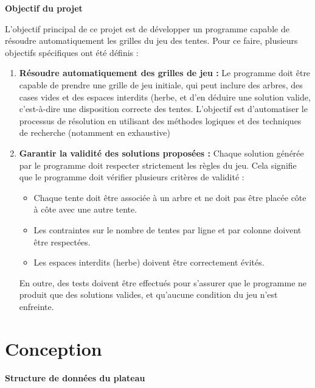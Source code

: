 \documentclass{article}
\begin{document}
\textbf{Objectif du projet}

L'objectif principal de ce projet est de développer un programme capable de résoudre automatiquement les grilles du jeu des tentes. Pour ce faire, plusieurs objectifs spécifiques ont été définis :

\begin{enumerate}
    \item \textbf{Résoudre automatiquement des grilles de jeu :}
    Le programme doit être capable de prendre une grille de jeu initiale, qui peut inclure des arbres, des cases vides et des espaces interdits (herbe, et d'en déduire une solution valide, c’est-à-dire une disposition correcte des tentes. L’objectif est d’automatiser le processus de résolution en utilisant des méthodes logiques et des techniques de recherche (notamment en exhaustive)

    \item \textbf{Garantir la validité des solutions proposées :}
    Chaque solution générée par le programme doit respecter strictement les règles du jeu. Cela signifie que le programme doit vérifier plusieurs critères de validité :

    \begin{itemize}
    \item Chaque tente doit être associée à un arbre et ne doit pas être placée côte à côte avec une autre tente.
    \item Les contraintes sur le nombre de tentes par ligne et par colonne doivent être respectées.
    \item Les espaces interdits (herbe) doivent être correctement évités.
    \end{itemize}
    
    En outre, des tests doivent être effectués pour s'assurer que le programme ne produit que des solutions valides, et qu'aucune condition du jeu n'est enfreinte.
\end{enumerate}

\section*{Conception}

\textbf{Structure de données du plateau}
\end{document}
